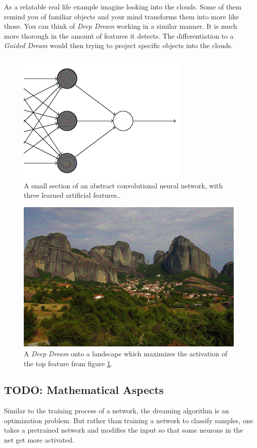 As a relatable real life example imagine looking into the clouds.
Some of them remind you of familiar objects and your mind transforms them into more like those.
You can think of \emph{Deep Dream} working in a similar manner.
It is much more thorough in the amount of features it detects.
The differentiation to a \emph{Guided Dream} would then trying to project specific objects into the clouds.

\begin{figure}[H]
	\centering
	\includegraphics[width=0.5\linewidth]{img/neurons-reaction.png}
	\caption{A small section of an abstract convolutional neural network, with three learned artificial features.\cite{nielsen2015neural}.}
	\label{fig:neuronreact}
\end{figure}

\begin{figure}[H]
	\centering
	\includegraphics[width=0.7\linewidth]{img/applied_neuron.jpg}
	\caption{A \textit{Deep Dream} onto a landscape which maximizes the activation of the top feature from figure \ref{fig:neuronreact}.\cite{imgmeteora}}
	\label{fig:applieddream}
\end{figure}




\subsection{TODO: Mathematical Aspects}
Similar to the training process of a network, the dreaming algorithm is an optimization problem.
But rather than training a network to classify samples, one takes a pretrained network and modifies the input so that some neurons in the net get more activated.


